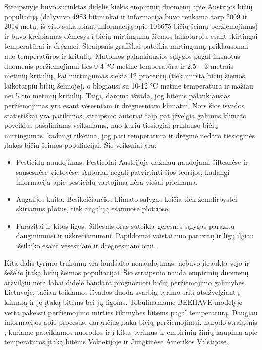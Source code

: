 \documentclass{VUMIFKompMagistrinis}
\begin{document}
Straipsnyje \cite{SCT17}  buvo surinktas didelis kiekis empirinių duomenų apie Austrijos bičių populiaciją (dalyvavo 4983 bitininkai ir informacija buvo renkama tarp 2009 ir 2014 metų, iš viso sukaupiant informaciją apie 106675 bičių šeimų peržiemojimus) ir buvo kreipiamas dėmesys į bičių mirtingumą žiemos laikotarpiu esant skirtingai temperatūrai ir drėgmei.
Straipsnis grafiškai pateikia mirtingumą priklausomai nuo temperatūros ir kritulių. Matomos palankiausios sąlygos pagal fiksuotus duomenis peržiemojimui ties 0-4 °C metine temperatūra ir 2,5 – 3 metrais metinių kritulių, kai mirtingumas siekia 12 procentų (tiek miršta bičių žiemos laikotarpiu bičių šeimoje), o blogiausi su 10-12 °C metine temperatūra ir mažiau nei 5 cm metinių kritulių. Taigi, daroma išvada, jog bitėms palankiausias peržiemojimas yra esant vėsesniam ir drėgnesniam klimatui.
Nors šios išvados statistiškai yra patikimos, straipsnio autoriai taip pat įžvelgia galimus klimato poveikius pašaliniams veiksniams, nuo kurių tiesiogiai priklauso bičių mirtingumas, kadangi tikėtina, jog pati temperatūra ir drėgmė nedaro tiesioginės įtakos bičių šeimos populiacijai. Šie veiksniai yra:
\begin{itemize}
    \item 	Pesticidų naudojimas. Pesticidai Austrijoje dažniau naudojami šiltesnėse ir sausesnėse vietovėse. Autoriai negali patvirtinti šios teorijos, kadangi informacija apie pesticidų vartojimą nėra viešai prieinama.
    \item Augalijos kaita. Besikeičiančios klimato sąlygos keičia tiek žemdirbystei skiriamus plotus, tiek augaliją esamuose plotuose.
    \item 	Parazitai ir kitos ligos. Šiltesnis oras suteikia geresnes sąlygas parazitų dauginimuisi ir užkrečiamumui. Papildomai vaistai nuo parazitų ir ligų ilgiau išsilaiko esant vėsesniam ir drėgnesniam orui.
\end{itemize}

Kita dalis tyrimo trūkumų yra landšafto nenaudojimas, nebuvo įtraukta vėjo ir šešėlio įtaką bičių šeimos populiacijai. Šio straipsnio nauda empirinių duomenų atžvilgiu nėra labai didelė bandant prognozuoti bičių peržiemojimo galimybes Lietuvoje, tačiau teikiamos išvados duoda svarbią tyrimo sritį atsižvelgiant į klimatą ir jo įtaką bitėms bei jų ligoms. Tobulinamame BEEHAVE modelyje verta pakeisti peržiemojimo mirties tikimybes bitėms pagal temperatūrą.
Daugiau informacijos apie procesus, darančius įtaką bičių peržiemojimui, nurodo straipsnis \cite{DFG15}, kuriame pateikiamos nuorodos ir į kitus tyrimus ir empirinių žinių kaupimą apie temperatūros įtaką bitėms Vokietijoje ir Jungtinėse Amerikos Valstijose.
\end{document}
